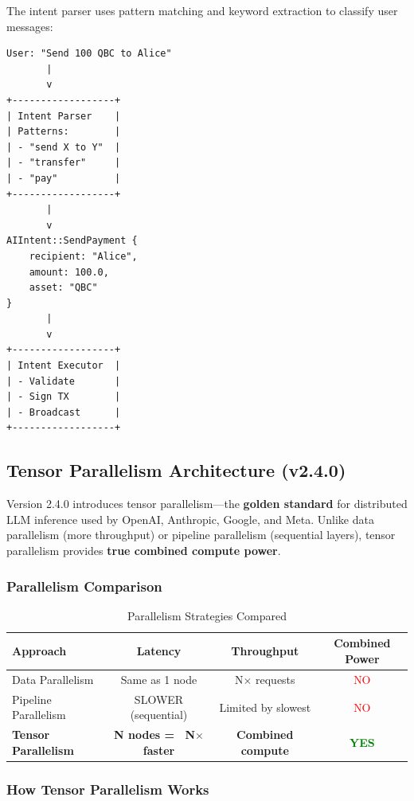 \documentclass[11pt,a4paper]{article}
\begin{document}
The intent parser uses pattern matching and keyword extraction to classify user messages:

\begin{lstlisting}[caption={Intent Classification Flow}]
User: "Send 100 QBC to Alice"
       |
       v
+------------------+
| Intent Parser    |
| Patterns:        |
| - "send X to Y"  |
| - "transfer"     |
| - "pay"          |
+------------------+
       |
       v
AIIntent::SendPayment {
    recipient: "Alice",
    amount: 100.0,
    asset: "QBC"
}
       |
       v
+------------------+
| Intent Executor  |
| - Validate       |
| - Sign TX        |
| - Broadcast      |
+------------------+
\end{lstlisting}

\subsection{Tensor Parallelism Architecture (v2.4.0)}

Version 2.4.0 introduces tensor parallelism---the \textbf{golden standard} for distributed LLM inference used by OpenAI, Anthropic, Google, and Meta. Unlike data parallelism (more throughput) or pipeline parallelism (sequential layers), tensor parallelism provides \textbf{true combined compute power}.

\subsubsection{Parallelism Comparison}

\begin{table}[H]
\centering
\caption{Parallelism Strategies Compared}
\begin{tabular}{|l|c|c|c|}
\hline
\textbf{Approach} & \textbf{Latency} & \textbf{Throughput} & \textbf{Combined Power} \\
\hline
Data Parallelism & Same as 1 node & N$\times$ requests & \textcolor{red}{NO} \\
Pipeline Parallelism & SLOWER (sequential) & Limited by slowest & \textcolor{red}{NO} \\
\textbf{Tensor Parallelism} & \textbf{N nodes = ~N$\times$ faster} & \textbf{Combined compute} & \textcolor{green}{\textbf{YES}} \\
\hline
\end{tabular}
\end{table}

\subsubsection{How Tensor Parallelism Works}
\end{document}
